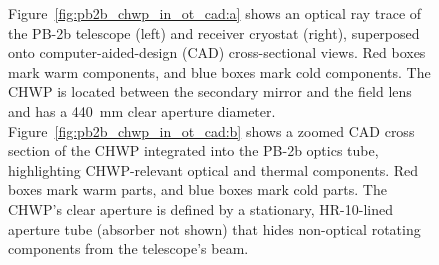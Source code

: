 \begin{figure}[tp]
    \centering
    \label{fig:pb2_ray_trace}
    \caption[CAD of the CHWP in PB-2b]{Figure~\ref{fig:pb2b_chwp_in_ot_cad:a} shows an optical ray trace of the PB-2b telescope (left) and receiver cryostat (right), superposed onto computer-aided-design (CAD) cross-sectional views. Red boxes mark warm components, and blue boxes mark cold components. The CHWP is located between the secondary mirror and the field lens and has a 440~mm clear aperture diameter. Figure~\ref{fig:pb2b_chwp_in_ot_cad:b} shows a zoomed CAD cross section of the CHWP integrated into the PB-2b optics tube, highlighting CHWP-relevant optical and thermal components. Red boxes mark warm parts, and blue boxes mark cold parts. The CHWP's clear aperture is defined by a stationary, HR-10-lined aperture tube (absorber not shown) that hides non-optical rotating components from the telescope's beam.}
    \label{fig:pb2b_chwp_in_ot_cad}
\end{figure}

